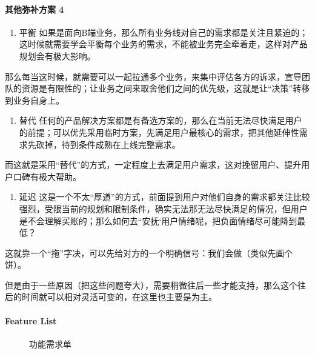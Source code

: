 \documentclass[letterpaper,10pt,english]{sphinxmanual}
\begin{document}
\paragraph{其他弥补方案 4\sphinxfootnotemark[679]}
\label{\detokenize{chapter_knowledge/upgrade_manage:id20}}%
\begin{footnotetext}[679]\sphinxAtStartFootnote
{}
%
\end{footnotetext}\ignorespaces \begin{enumerate}
%
\item {} 
平衡
如果是面向B端业务，那么所有业务线对自己的需求都是关注且紧迫的；这时候就需要学会平衡每个业务的需求，不能被业务完全牵着走，这样对产品规划会有极大影响。

\end{enumerate}

那么每当这时候，就需要可以一起拉通多个业务，来集中评估各方的诉求，宣导团队的资源是有限性的；让业务之间来取舍他们之间的优先级，这就是让“决策”转移到业务自身上。
\begin{enumerate}
%
\setcounter{enumi}{1}
\item {} 
替代
任何的产品解决方案都是有备选方案的，那么在当前无法尽快满足用户的前提；可以优先采用临时方案，先满足用户最核心的需求，把其他延伸性需求先砍掉，待到条件成熟在上线完整需求。

\end{enumerate}

而这就是采用“替代”的方式，一定程度上去满足用户需求，这对挽留用户、提升用户口碑有极大帮助。
\begin{enumerate}
%
\setcounter{enumi}{2}
\item {} 
延迟
这是一个不太“厚道”的方式，前面提到用户对他们自身的需求都关注比较强烈，受限当前的规划和限制条件，确实无法那无法尽快满足的情况，但用户是不会理解买账的；那么如何去“安抚‘用户情绪呢，把负面情绪尽可能降到最低？

\end{enumerate}

这就靠一个“拖”字决，可以先给对方的一个明确信号：我们会做（类似先画个饼）。

但是由于一些原因（把这些问题夸大），需要稍微往后一些才能支持，那么这个往后的时间就可以相对灵活可变的，在这里也主要是为主。


\paragraph{Feature List}
\label{\detokenize{chapter_knowledge/upgrade_manage:feature-list}}
\begin{figure}[H]
\centering
\capstart

\noindent{}
\caption{功能需求单}\label{\detokenize{chapter_knowledge/upgrade_manage:id26}}\end{figure}
\end{document}
